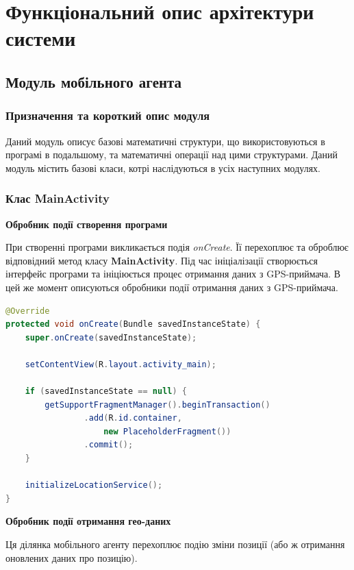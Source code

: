 \documentclass[simple,a4paper,14pt,ukrainian,utf8]{eskdtext}
\begin{document}
\clearpage \newpage \section{Функціональний опис архітектури системи}

    \subsection{Модуль мобільного агента}

        \subsubsection{Призначення та короткий опис модуля}

            Даний модуль описує базові математичні структури, що використовуються в програмі в подальшому, та математичні операції над цими структурами. Даний модуль містить базові класи, котрі наслідуються в усіх наступних модулях.

        \subsubsection{Клас MainActivity}
        
        	\textbf{Обробник події створення програми}
        	
        	При створенні програми викликається подія \textit{onCreate}. Її перехоплює та оброблює відповідний метод класу \textbf{MainActivity}. Під час ініціалізації створюється інтерфейс програми та ініціюється процес отримання даних з GPS-приймача. В цей же момент описуються обробники події отримання даних з GPS-приймача.
        	
        	\begin{lstlisting}[language=Java]
@Override
protected void onCreate(Bundle savedInstanceState) {
    super.onCreate(savedInstanceState);

    setContentView(R.layout.activity_main);

    if (savedInstanceState == null) {
        getSupportFragmentManager().beginTransaction()
                .add(R.id.container, 
                	new PlaceholderFragment())
                .commit();
    }

    initializeLocationService();
}
        	\end{lstlisting}
        	
        	\textbf{Обробник події отримання гео-даних}
        	
        	Ця ділянка мобільного агенту перехоплює подію зміни позиції (або ж отримання оновлених даних про позицію).
        	
\end{document}
